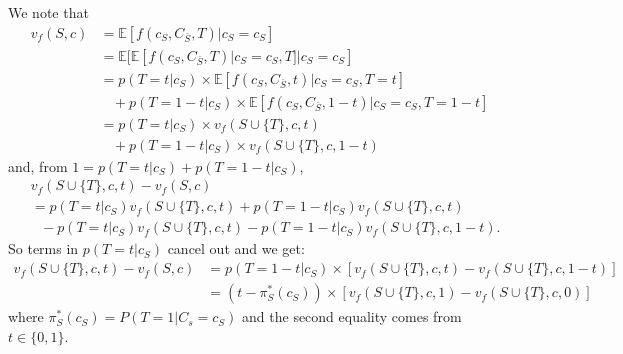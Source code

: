 We note that
\begin{align*}
    v_f(S,c) &=  \mathbb{E}[f(c_S, C_{\bar{S}}, T) | c_S = c_S] \\
    &=  \mathbb{E} [\mathbb{E}[f(c_S, C_{\bar{S}}, T) | c_S = c_S, T] | c_S=c_S] \\
    &= p(T=t | c_S) \times \mathbb{E}[f(c_S, C_{\bar{S}}, t)|c_S=c_S, T=t]  \\ 
    & \ \ \ \ + p(T=1-t|c_S) \times \mathbb{E}[f(c_S, C_{\bar{S}}, 1-t)|c_S=c_S, T=1-t] \\
    &= p(T=t|c_S) \times v_{f}(S \cup \{T\},c,t)  \\ 
     & \ \ \ \ + p(T=1-t|c_S) \times v_{f}(S \cup \{T\},c,1-t)
\end{align*}
and, from $1=p(T=t | c_S)+p(T=1-t | c_S)$,
\begin{align*}
    &v_{f}(S \cup \{T\},c,t) - v_{f}(S,c) \\
    &= p(T=t | c_S) v_{f}(S \cup \{T\},c,t)  + p(T=1-t | c_S) v_{f}(S \cup \{T\},c,t) \\
    & \ \ \ - p(T=t | c_S) v_{f}(S \cup \{T\},c,t) - p(T=1-t | c_S) v_{f}(S \cup \{T\},c,1-t).
\end{align*}
So terms in $p(T=t | c_S)$ cancel out and we get:
\begin{align*}
    v_{f}(S \cup \{T\},c,t) - v_{f}(S,c) &=  p(T=1-t | c_S) \times [ v_{f}(S \cup \{T\},c,t)   - v_{f}(S \cup \{T\},c,1-t)] \\
    &= (t - \pi^*_S(c_S)) \times [v_{f}(S \cup \{T\},c,1)  - v_{f}(S \cup \{T\},c,0)]
\end{align*}
where $\pi^*_S(c_S) = P(T=1|C_s=c_S)$ and the second equality comes from $t \in \{0,1\}$. 

